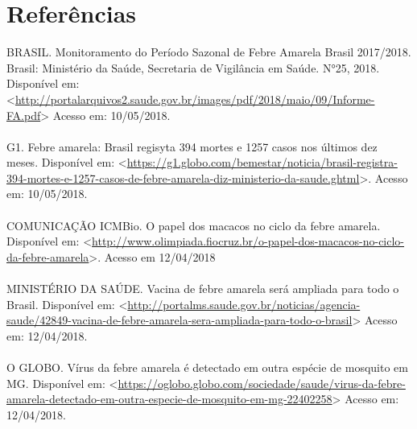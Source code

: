 \documentclass{article}
\begin{document}
    
\newpage %


\section*{\centering\large{\calibrifont Referências}} %

\justifying
 
	BRASIL. Monitoramento do Período Sazonal de Febre Amarela Brasil 2017/2018. Brasil: Ministério da Saúde, Secretaria de Vigilância em Saúde. N°25, 2018. Disponível em: <\url{http://portalarquivos2.saude.gov.br/images/pdf/2018/maio/09/Informe-FA.pdf}> Acesso em: 10/05/2018.
\\ \\
	 G1.  Febre amarela: Brasil regisyta 394 mortes e 1257 casos nos últimos dez meses. Disponível em: <\url{https://g1.globo.com/bemestar/noticia/brasil-registra-394-mortes-e-1257-casos-de-febre-amarela-diz-ministerio-da-saude.ghtml}>. Acesso em: 10/05/2018.
\\ \\
	COMUNICAÇÃO ICMBio. O papel dos macacos no ciclo da febre amarela.  Disponível em: <\url{http://www.olimpiada.fiocruz.br/o-papel-dos-macacos-no-ciclo-da-febre-amarela}>. Acesso em 12/04/2018
\\ \\
	MINISTÉRIO DA SAÚDE. Vacina de febre amarela será ampliada para todo o Brasil. Disponível em: <\url{http://portalms.saude.gov.br/noticias/agencia-saude/42849-vacina-de-febre-amarela-sera-ampliada-para-todo-o-brasil}> Acesso em: 12/04/2018.
\\ \\
	O GLOBO. Vírus da febre amarela é detectado em outra espécie de mosquito em MG. Disponível em: <\url{https://oglobo.globo.com/sociedade/saude/virus-da-febre-amarela-detectado-em-outra-especie-de-mosquito-em-mg-22402258}> Acesso em: 12/04/2018.
\end{document}
